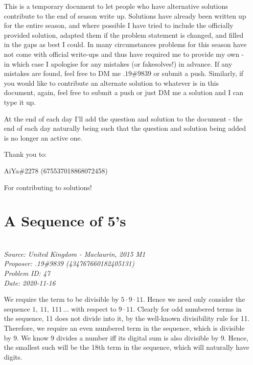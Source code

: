 \documentclass[titlepage=true]{scrartcl}
\def\Paiya{AiYa\#2278 (675537018868072458)}
\begin{document}
\SSfp

This is a temporary document to let people who have alternative solutions contribute to the end of season write up.
Solutions have already been written up for the entire season, and where possible I have tried to include the officially provided solution, adapted them if the problem statement is changed, and filled in the gaps as best I could.
In many circumstances problems for this season have not come with official write-ups and thus have required me to provide my own - in which case I apologise for any mistakes (or fakesolves!) in advance.
If any mistakes are found, feel free to DM me \(.19\#9839\) or submit a push.
Similarly, if you would like to contribute an alternate solution to whatever is in this document, again, feel free to submit a push or just DM me a solution and I can type it up.
\medskip
 
At the end of each day I'll add the question and solution to the document - the end of each day naturally being such that the question and solution being added is no longer an active one.\bigskip

Thank you to:\medskip

\Paiya\medskip

For contributing to solutions! 

\newpage
    
\section{A Sequence of 5's}

    \SSbreak\\
    \emph{Source: United Kingdom - Maclaurin, 2015 M1}\\
    \emph{Proposer: .19\#9839 (434767660182405131)}\\
    \emph{Problem ID: 47}\\
    \emph{Date: 2020-11-16}\\
    \SSbreak
        
    \bigskip

    \begin{solution}\hfil\medskip

        We require the term to be divisible by \(5\cdot9\cdot 11\).
		Hence we need only consider the sequence \(1,\ 11,\ 111\,\ldots\) with respect to \(9\cdot11\).
		Clearly for odd numbered terms in the sequence, 11 does not divide into it, by the well-known divisibility rule for 11.
		Therefore, we require an even numbered term in the sequence, which is divisible by 9.
		We know 9 divides a number iff its digital sum is also divisible by 9.
		Hence, the smallest such will be the 18th term in the sequence, which will naturally have  digits. 
    \end{solution}\bigskip
\end{document}
